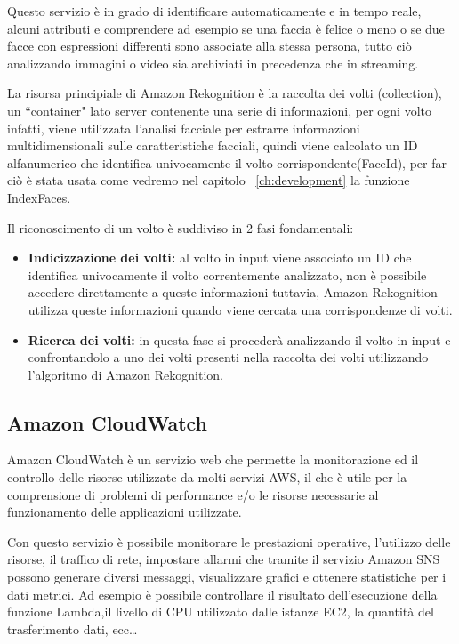 Questo servizio è in grado di identificare automaticamente e in tempo reale, alcuni attributi e comprendere ad esempio se una faccia è felice o meno o se due facce con 
espressioni differenti sono associate alla stessa persona, tutto ciò analizzando immagini o video sia archiviati in precedenza che in streaming.

La risorsa principiale di Amazon Rekognition è la raccolta dei volti (collection), un ``container" lato server contenente una serie di informazioni, 
per ogni volto infatti, viene utilizzata l'analisi facciale per estrarre informazioni multidimensionali sulle caratteristiche facciali, quindi viene calcolato un
ID alfanumerico che identifica univocamente il volto corrispondente(FaceId), per far ciò è stata usata come vedremo nel capitolo ~\ref{ch:development} la funzione 
IndexFaces.

Il riconoscimento di un volto è suddiviso in 2 fasi fondamentali:
\begin{itemize}
    \item \textbf{Indicizzazione dei volti:} al volto in input viene associato un ID che identifica univocamente il volto correntemente analizzato, non 
    è possibile accedere direttamente a queste informazioni tuttavia, Amazon Rekognition utilizza queste informazioni quando viene cercata una corrispondenze di volti.
    \item \textbf{Ricerca dei volti:} in questa fase si procederà analizzando il volto in input e confrontandolo a uno dei volti presenti nella raccolta dei volti 
    utilizzando l'algoritmo di Amazon Rekognition.
\end{itemize}

\subsection{Amazon CloudWatch}

Amazon CloudWatch è un servizio web che permette la monitorazione ed il controllo delle risorse utilizzate da molti servizi AWS, il che è utile per la 
comprensione di problemi di performance e/o le risorse necessarie al funzionamento delle applicazioni utilizzate. 

Con questo servizio è possibile monitorare le prestazioni operative, l’utilizzo delle risorse, il traffico di rete, impostare allarmi che tramite il servizio Amazon 
SNS possono generare diversi messaggi, visualizzare grafici e ottenere statistiche per i dati metrici.
Ad esempio è possibile controllare il risultato dell'esecuzione della funzione Lambda,il livello di CPU utilizzato dalle istanze EC2, la quantità del trasferimento 
dati, ecc\dots

